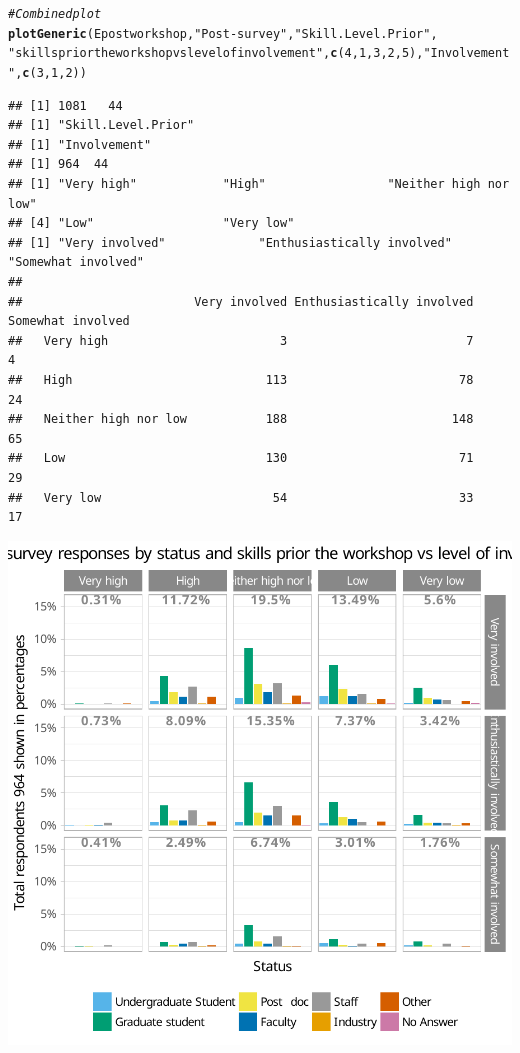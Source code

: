 \documentclass{article}\usepackage[]{graphicx}\usepackage[]{color}
\makeatletter
\newcommand{\hlnum}[1]{\textcolor[rgb]{0.686,0.059,0.569}{#1}}%
\newcommand{\hlstr}[1]{\textcolor[rgb]{0.192,0.494,0.8}{#1}}%
\newcommand{\hlcom}[1]{\textcolor[rgb]{0.678,0.584,0.686}{\textit{#1}}}%
\newcommand{\hlstd}[1]{\textcolor[rgb]{0.345,0.345,0.345}{#1}}%
\newcommand{\hlkwd}[1]{\textcolor[rgb]{0.737,0.353,0.396}{\textbf{#1}}}%
\newenvironment{kframe}{%
 \def\at@end@of@kframe{}%
 \ifinner\ifhmode%
  \def\at@end@of@kframe{\end{minipage}}%
  \begin{minipage}{\columnwidth}%
 \fi\fi%
 \def\FrameCommand##1{\hskip\@totalleftmargin \hskip-\fboxsep
 \colorbox{shadecolor}{##1}\hskip-\fboxsep
     \hskip-\linewidth \hskip-\@totalleftmargin \hskip\columnwidth}%
 \MakeFramed {\advance\hsize-\width
   \@totalleftmargin\z@ \linewidth\hsize
   \@setminipage}}%
 {\par\unskip\endMakeFramed%
 \at@end@of@kframe}
\newenvironment{knitrout}{}{} %
\makeatother
\begin{document}
\begin{knitrout}
\begin{kframe}\begin{alltt}
\hlcom{# Combined plot}
\hlkwd{plotGeneric}\hlstd{(Epostworkshop,} \hlstr{"Post-survey"}\hlstd{,} \hlstr{"Skill.Level.Prior"} \hlstd{,}
            \hlstr{"skills prior the workshop vs level of involvement"}\hlstd{,} \hlkwd{c}\hlstd{(}\hlnum{4}\hlstd{,}\hlnum{1}\hlstd{,}\hlnum{3}\hlstd{,}\hlnum{2}\hlstd{,}\hlnum{5}\hlstd{),}\hlstr{"Involvement"}\hlstd{,} \hlkwd{c}\hlstd{(}\hlnum{3}\hlstd{,}\hlnum{1}\hlstd{,}\hlnum{2}\hlstd{))}
\end{alltt}
\begin{verbatim}
## [1] 1081   44
## [1] "Skill.Level.Prior"
## [1] "Involvement"
## [1] 964  44
## [1] "Very high"            "High"                 "Neither high nor low"
## [4] "Low"                  "Very low"            
## [1] "Very involved"             "Enthusiastically involved" "Somewhat involved"        
##                       
##                        Very involved Enthusiastically involved Somewhat involved
##   Very high                        3                         7                 4
##   High                           113                        78                24
##   Neither high nor low           188                       148                65
##   Low                            130                        71                29
##   Very low                        54                        33                17
\end{verbatim}
\end{kframe}

{\centering \includegraphics[width=.6\linewidth]{figure/calls-Rnwplotting-postsurvey-data-14} 

}



\end{knitrout}
\end{document}
